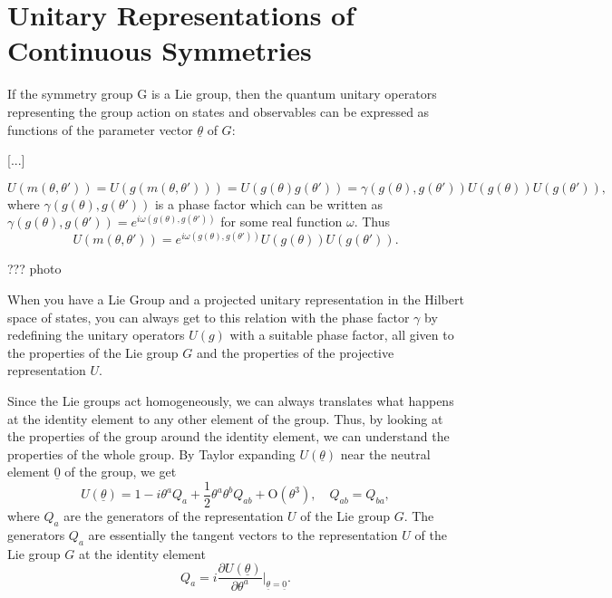 \section{Unitary Representations of Continuous Symmetries}

If the symmetry group G is a Lie group, then the quantum unitary operators representing the group action on states and observables can be expressed as functions of the parameter vector \(\underline{\theta}\) of \(G\):

[...]

\[
    U(m(\theta, \theta')) = U(g(m(\theta, \theta'))) = U(g(\theta) g(\theta')) = \gamma(g(\theta), g(\theta')) U(g(\theta)) U(g(\theta')),
\]
where \(\gamma(g(\theta), g(\theta'))\) is a phase factor which can be written as \(\gamma(g(\theta), g(\theta')) = e^{i \omega(g(\theta), g(\theta'))}\) for some real function \(\omega\). Thus
\[
    U(m(\theta, \theta')) = e^{i \omega(g(\theta), g(\theta'))} U(g(\theta)) U(g(\theta')).
\]

\begin{example}[EXCERCISE]

    ??? photo

\end{example}

When you have a Lie Group and a projected unitary representation in the Hilbert space of states, you can always get to this relation with the phase factor \(\gamma\) by redefining the unitary operators \(U(g)\) with a suitable phase factor, all given to the properties of the Lie group \(G\) and the properties of the projective representation \(U\).

Since the Lie groups act homogeneously, we can always translates what happens at the identity element to any other element of the group. Thus, by looking at the properties of the group around the identity element, we can understand the properties of the whole group. By Taylor expanding \(U(\underline{\theta})\) near the neutral element \(\underline{0}\) of the group, we get
\[
    U(\underline{\theta}) = 1 - i \theta^a Q_a + \frac{1}{2} \theta^a \theta^b Q_{ab} + \mathrm{O}(\theta^3), \quad Q_{ab} = Q_{ba},
\]
where \(Q_a\) are the generators of the representation \(U\) of the Lie group \(G\). The generators \(Q_a\) are essentially the tangent vectors to the representation \(U\) of the Lie group \(G\) at the identity element
\[
    Q_a = i \frac{\partial U(\underline{\theta})}{\partial \theta^a} \Big|_{\underline{\theta} = \underline{0}}.
\]

